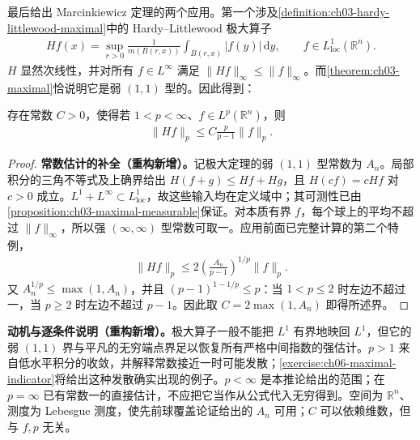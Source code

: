 \documentclass[../../main.tex]{subfiles}
\begin{document}
最后给出 Marcinkiewicz 定理的两个应用。第一个涉及\cref{definition:ch03-hardy-littlewood-maximal}中的 Hardy–Littlewood 极大算子
\begin{align*}
Hf(x)=\sup_{r>0}\frac1{m(B(r,x))}\int_{B(r,x)}|f(y)|\,\mathrm dy,
\qquad f\in L^1_{\mathrm{loc}}(\mathbb R^n).
\end{align*}
$H$ 显然次线性，并对所有 $f\in L^\infty$ 满足 $\|Hf\|_\infty\leqslant\|f\|_\infty$。而\cref{theorem:ch03-maximal}恰说明它是弱 $(1,1)$ 型的。因此得到：
\begin{corollary}\label{corollary:ch06-maximal-lp}
存在常数 $C>0$，使得若 $1<p<\infty$、$f\in L^p(\mathbb R^n)$，则
\begin{align*}
\|Hf\|_p\leqslant C\frac p{p-1}\|f\|_p.
\end{align*}
\end{corollary}
\begin{proof}
\textbf{常数估计的补全（重构新增）。}记极大定理的弱 $(1,1)$ 型常数为 $A_n$。局部积分的三角不等式及上确界给出 $H(f+g)\leqslant Hf+Hg$，且 $H(cf)=cHf$ 对 $c>0$ 成立。$L^1+L^\infty\subset L^1_{\mathrm{loc}}$，故这些输入均在定义域中；其可测性已由\cref{proposition:ch03-maximal-measurable}保证。对本质有界 $f$，每个球上的平均不超过 $\|f\|_\infty$，所以强 $(\infty,\infty)$ 型常数可取一。应用前面已完整计算的第二个特例，
\begin{align*}
\|Hf\|_p\leqslant2\left(\frac{A_n}{p-1}\right)^{1/p}\|f\|_p.
\end{align*}
又 $A_n^{1/p}\leqslant\max(1,A_n)$，并且 $(p-1)^{1-1/p}\leqslant p$：当 $1<p\leqslant2$ 时左边不超过一，当 $p\geqslant2$ 时左边不超过 $p-1$。因此取 $C=2\max(1,A_n)$ 即得所述界。
\end{proof}
\begin{remark}
\textbf{动机与逐条件说明（重构新增）。}极大算子一般不能把 $L^1$ 有界地映回 $L^1$，但它的弱 $(1,1)$ 界与平凡的无穷端点界足以恢复所有严格中间指数的强估计。$p>1$ 来自低水平积分的收敛，并解释常数接近一时可能发散；\cref{exercise:ch06-maximal-indicator}将给出这种发散确实出现的例子。$p<\infty$ 是本推论给出的范围；在 $p=\infty$ 已有常数一的直接估计，不应把它当作从公式代入无穷得到。空间为 $\mathbb R^n$、测度为 Lebesgue 测度，使先前球覆盖论证给出的 $A_n$ 可用；$C$ 可以依赖维数，但与 $f,p$ 无关。
\end{remark}
\end{document}
